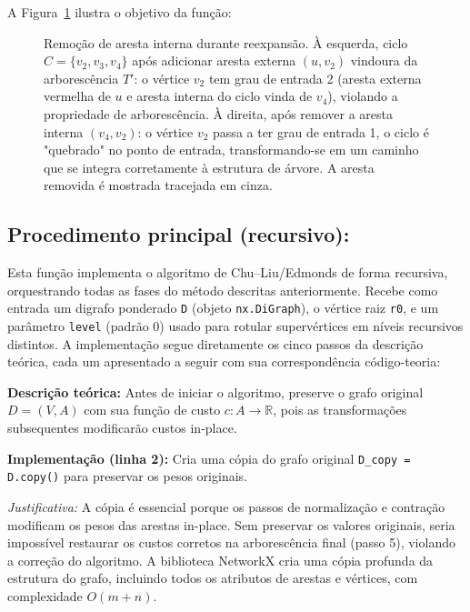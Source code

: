 A Figura~\ref{fig:remove-internal-edge-example} ilustra o objetivo da função:

\begin{figure}[H]
    \centering
    
    \caption{Remoção de aresta interna durante reexpansão. À esquerda, ciclo $C=\{v_2, v_3, v_4\}$ após adicionar aresta externa $(u, v_2)$ vindoura da arborescência $T'$: o vértice $v_2$ tem grau de entrada 2 (aresta externa vermelha de $u$ e aresta interna do ciclo vinda de $v_4$), violando a propriedade de arborescência. À direita, após remover a aresta interna $(v_4, v_2)$: o vértice $v_2$ passa a ter grau de entrada 1, o ciclo é "quebrado" no ponto de entrada, transformando-se em um caminho que se integra corretamente à estrutura de árvore. A aresta removida é mostrada tracejada em cinza.}
    \label{fig:remove-internal-edge-example}
\end{figure}

\subsection{Procedimento principal (recursivo):}
Esta função implementa o algoritmo de Chu–Liu/Edmonds de forma recursiva, orquestrando todas as fases do método descritas anteriormente. Recebe como entrada um digrafo ponderado \texttt{D} (objeto \texttt{nx.DiGraph}), o vértice raiz \texttt{r0}, e um parâmetro \texttt{level} (padrão 0) usado para rotular supervértices em níveis recursivos distintos. A implementação segue diretamente os cinco passos da descrição teórica, cada um apresentado a seguir com sua correspondência código-teoria:

\begin{tcolorbox}[
        enhanced, breakable,
        colframe=green!60!black, colback=green!5,
        colbacktitle=green!20, coltitle=black,
        title={Passo 1: Cópia do grafo original},
        boxed title style={sharp corners, boxrule=0.6pt},
        sharp corners, boxrule=0.6pt
    ]
    \textbf{Descrição teórica:} Antes de iniciar o algoritmo, preserve o grafo original \(D=(V,A)\) com sua função de custo \(c:A\to\mathbb{R}\), pois as transformações subsequentes modificarão custos in-place.

    \tcblower

    \textbf{Implementação (linha 2):} Cria uma cópia do grafo original \texttt{D\_copy = D.copy()} para preservar os pesos originais.

    \emph{Justificativa:} A cópia é essencial porque os passos de normalização e contração modificam os pesos das arestas in-place. Sem preservar os valores originais, seria impossível restaurar os custos corretos na arborescência final (passo 5), violando a correção do algoritmo. A biblioteca NetworkX cria uma cópia profunda da estrutura do grafo, incluindo todos os atributos de arestas e vértices, com complexidade \(O(m+n)\).
\end{tcolorbox}

